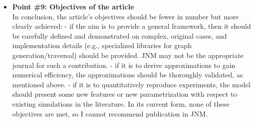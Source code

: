 \documentclass{article}
\begin{document}
\begin{itemize}
\item \textbf{Point \#9: Objectives of the article}\\
In conclusion, the article's objectives should be fewer in number but more clearly achieved: - if the aim is to provide a general framework, then it should be carefully defined and demonstrated on complex, original cases, and implementation details (e.g., specialized libraries for graph generation/traversal) should be provided. JNM may not be the appropriate journal for such a contribution. - if it is to derive approximations to gain numerical efficiency, the approximations should be thoroughly validated, as mentioned above. - if it is to quantitatively reproduce experiments, the model should present some new features or new parametrization with respect to existing simulations in the literature. In its current form, none of these objectives are met, so I cannot recommend publication in JNM.\\


\end{itemize}
\end{document}
